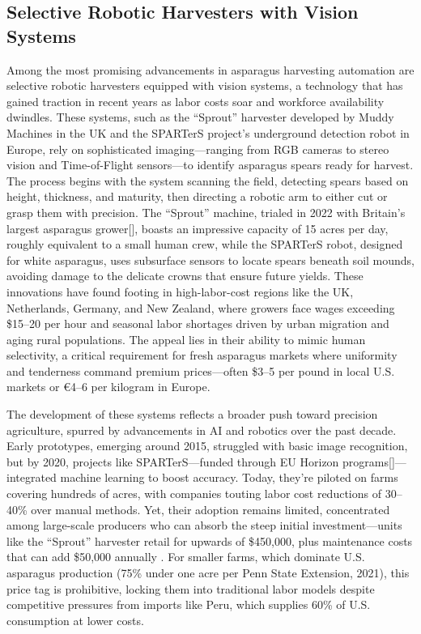 \subsection{Selective Robotic Harvesters with Vision Systems}
Among the most promising advancements in asparagus harvesting automation are selective robotic harvesters equipped with vision systems, a technology that has gained traction in recent years as labor costs soar and workforce availability dwindles. These systems, such as the ``Sprout'' harvester developed by Muddy Machines in the UK and the SPARTerS project’s underground detection robot in Europe, rely on sophisticated imaging—ranging from RGB cameras to stereo vision and Time-of-Flight sensors—to identify asparagus spears ready for harvest. The process begins with the system scanning the field, detecting spears based on height, thickness, and maturity, then directing a robotic arm to either cut or grasp them with precision. The ``Sprout'' machine, trialed in 2022 with Britain’s largest asparagus grower[\cite{muddymachines2025}], boasts an impressive capacity of 15 acres per day, roughly equivalent to a small human crew, while the SPARTerS robot, designed for white asparagus, uses subsurface sensors to locate spears beneath soil mounds, avoiding damage to the delicate crowns that ensure future yields. These innovations have found footing in high-labor-cost regions like the UK, Netherlands, Germany, and New Zealand, where growers face wages exceeding \$15--20 per hour and seasonal labor shortages driven by urban migration and aging rural populations. The appeal lies in their ability to mimic human selectivity, a critical requirement for fresh asparagus markets where uniformity and tenderness command premium prices—often \$3--5 per pound in local U.S. markets or €4--6 per kilogram in Europe.

The development of these systems reflects a broader push toward precision agriculture, spurred by advancements in AI and robotics over the past decade. Early prototypes, emerging around 2015, struggled with basic image recognition, but by 2020, projects like SPARTerS—funded through EU Horizon programs[\cite{pnoconsultants_horizon}]—integrated machine learning to boost accuracy. Today, they’re piloted on farms covering hundreds of acres, with companies touting labor cost reductions of 30--40\% over manual methods. Yet, their adoption remains limited, concentrated among large-scale producers who can absorb the steep initial investment—units like the ``Sprout'' harvester retail for upwards of \$450,000, plus maintenance costs that can add \$50,000 annually \cite{muddymachines2025}. For smaller farms, which dominate U.S. asparagus production (75\% under one acre per Penn State Extension, 2021), this price tag is prohibitive, locking them into traditional labor models despite competitive pressures from imports like Peru, which supplies 60\% of U.S. consumption at lower costs.

